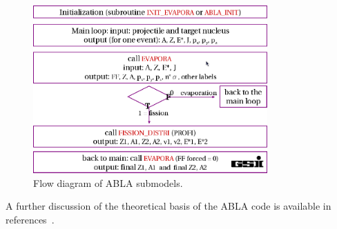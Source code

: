 \begin{figure}[h] 
\begin{center}
\includegraphics[width=0.8\textwidth]{images/AblaTable.png}
\caption{\label{fig:ablatable}Flow diagram of ABLA submodels.}
 \end{center}
 \end{figure}

A further discussion of the theoretical basis of the ABLA code is available in references~\cite{ablatalk,iia}.

\clearpage
{}
\renewcommand{\theequation}{E\arabic{equation}}
\setcounter{equation}{0}  
\renewcommand{\thefigure}{E\arabic{figure}}
\setcounter{figure}{0}
\renewcommand{\thetable}{E\arabic{table}}
\setcounter{table}{0}
\renewcommand{\thesection}{E}
\setcounter{section}{1}
\setcounter{subsection}{0}

